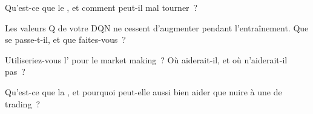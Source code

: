 \begin{interviewq}\label{iq:ml:reinforcement-learning-for-execution-and-market-making:3}
Qu'est-ce que le , et comment peut-il mal tourner~?
\end{interviewq}

\begin{interviewq}\label{iq:ml:reinforcement-learning-for-execution-and-market-making:4}
Les valeurs Q de votre DQN ne cessent d'augmenter pendant l'entraînement. Que se passe-t-il, et que faites-vous~?
\end{interviewq}

\begin{interviewq}\label{iq:ml:reinforcement-learning-for-execution-and-market-making:5}
Utiliseriez-vous l' pour le market making~? Où aiderait-il, et où n'aiderait-il pas~?
\end{interviewq}

\begin{interviewq}\label{iq:ml:reinforcement-learning-for-execution-and-market-making:6}
Qu'est-ce que la , et pourquoi peut-elle aussi bien aider que nuire à une  de trading~?
\end{interviewq}
